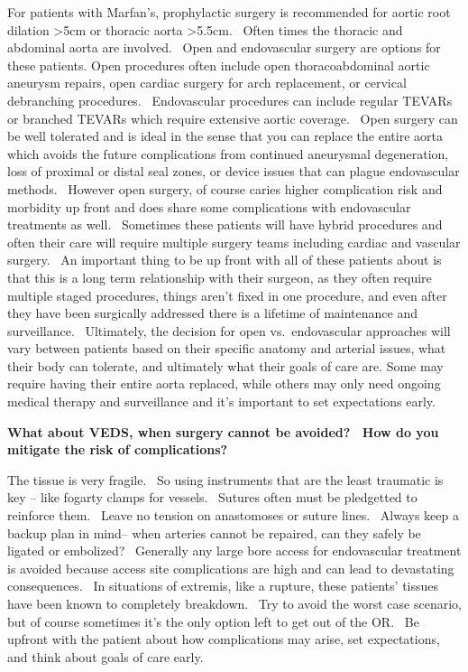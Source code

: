 \documentclass[
]{book}
\begin{document}
For patients with Marfan's, prophylactic surgery is recommended for
aortic root dilation \textgreater5cm or thoracic aorta \textgreater5.5cm.~ Often times the
thoracic and abdominal aorta are involved.~ Open and endovascular
surgery are options for these patients. Open procedures often include
open thoracoabdominal aortic aneurysm repairs, open cardiac surgery for
arch replacement, or cervical debranching procedures.~ Endovascular
procedures can include regular TEVARs or branched TEVARs which require
extensive aortic coverage.~ Open surgery can be well tolerated and is
ideal in the sense that you can replace the entire aorta which avoids
the future complications from continued aneurysmal degeneration, loss of
proximal or distal seal zones, or device issues that can plague
endovascular methods.~ However open surgery, of course caries higher
complication risk and morbidity up front and does share some
complications with endovascular treatments as well.~ Sometimes these
patients will have hybrid procedures and often their care will require
multiple surgery teams including cardiac and vascular surgery.~ An
important thing to be up front with all of these patients about is that
this is a long term relationship with their surgeon, as they often
require multiple staged procedures, things aren't fixed in one
procedure, and even after they have been surgically addressed there is a
lifetime of maintenance and surveillance.~ Ultimately, the decision for
open vs.~endovascular approaches will vary between patients based on
their specific anatomy and arterial issues, what their body can
tolerate, and ultimately what their goals of care
are.\citep{lumEndovascularProceduresPatients2012a} Some may require having
their entire aorta replaced, while others may only need ongoing medical
therapy and surveillance and it's important to set expectations early.

\textbf{What about VEDS, when surgery cannot be avoided?~ How do you mitigate
the risk of complications?}

The tissue is very fragile.~ So using instruments that are the least
traumatic is key -- like fogarty clamps for vessels.~ Sutures often must
be pledgetted to reinforce them.~ Leave no tension on anastomoses or
suture lines.~ Always keep a backup plan in mind-- when arteries cannot
be repaired, can they safely be ligated or embolized?~ Generally any
large bore access for endovascular treatment is avoided because access
site complications are high and can lead to devastating consequences.~
In situations of extremis, like a rupture, these patients' tissues have
been known to completely breakdown.~ Try to avoid the worst case
scenario, but of course sometimes it's the only option left to get out
of the OR.~ Be upfront with the patient about how complications may
arise, set expectations, and think about goals of care early.
\end{document}
